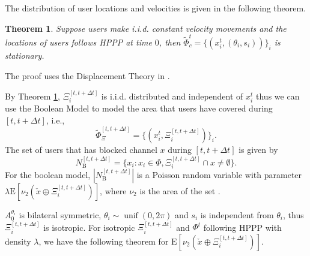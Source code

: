 \documentclass[10pt, conference, letterpaper]{IEEEtran}
\newtheorem{theorem}{Theorem}
\DeclareMathOperator*{\unif}{unif}
\begin{document}
The distribution of user locations and velocities is given in the following theorem.
\begin{theorem}\label{theorem:boolean_stationary}
Suppose users make i.i.d. constant velocity movements and the locations of users follows HPPP at time $0$, then $\tilde{\Phi}_c^t = \{(x_i^t, (\theta_i, s_i))\}_i$ is stationary.
\end{theorem}
The proof uses the Displacement Theory in \cite{poisson}.

By Theorem \ref{theorem:boolean_stationary}, 
$\Xi_i^{[t, t+\Delta t]}$ is i.i.d. distributed and independent of $x_i^t$ thus we can use the Boolean Model \cite{stochasticgeometry} to model the area that users have covered during $[t, t+\Delta t]$, i.e., 
\begin{equation*}
\tilde{\Phi}_{\Xi}^{[t, t+\Delta t]} = \{(x_i^t, \Xi_i^{[t, t+\Delta t]})\}_i.
\end{equation*}
The set of users that has blocked channel $x$ during $[t, t+\Delta t]$ is given by
\begin{equation*}
N_{\mathrm{B}}^{[t, t + \Delta t]} = \{x_i:x_i \in \Phi, \Xi_i^{[t, t+\Delta t]}\cap x \neq \emptyset \}.
\end{equation*}
For the boolean model, $|N_{\mathrm{B}}^{[t, t + \Delta t]}|$ is a Poisson random variable with parameter $\lambda\mathrm{E}[\nu_2(\check{x}\oplus \Xi_i^{[t, t+\Delta t]})]$, where $\nu_2$ is the area of the set \cite{stochasticgeometry}.

$A_0^{\theta_i}$ is bilateral symmetric, $\theta_i\sim\unif(0, 2\pi)$ and $s_i$ is independent from $\theta_i$, thus $\Xi_i^{[t, t+\Delta t]}$ is isotropic. For isotropic $\Xi_i^{[t, t+\Delta t]}$ and $\Phi^t$ following HPPP with density $\lambda$, we have the following theorem for $\mathrm{E}[\nu_2(\check{x}\oplus\Xi_i^{[t, t+\Delta t]})]$.
\end{document}
